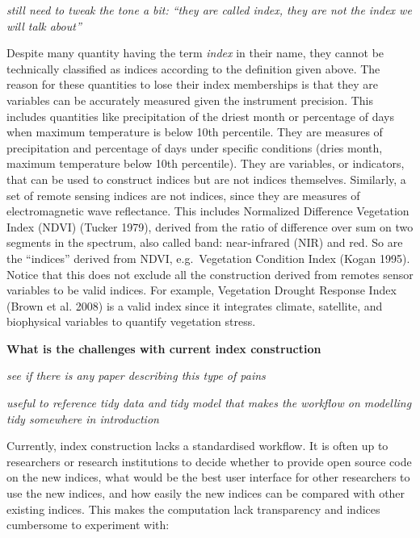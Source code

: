 \documentclass[
]{article}
\begin{document}
\emph{still need to tweak the tone a bit: ``they are called index, they
are not the index we will talk about''}

Despite many quantity having the term \emph{index} in their name, they
cannot be technically classified as indices according to the definition
given above. The reason for these quantities to lose their index
memberships is that they are variables can be accurately measured given
the instrument precision. This includes quantities like precipitation of
the driest month or percentage of days when maximum temperature is below
10th percentile. They are measures of precipitation and percentage of
days under specific conditions (dries month, maximum temperature below
10th percentile). They are variables, or indicators, that can be used to
construct indices but are not indices themselves. Similarly, a set of
remote sensing indices are not indices, since they are measures of
electromagnetic wave reflectance. This includes Normalized Difference
Vegetation Index (NDVI) (Tucker 1979), derived from the ratio of
difference over sum on two segments in the spectrum, also called band:
near-infrared (NIR) and red. So are the ``indices'' derived from NDVI,
e.g.~Vegetation Condition Index (Kogan 1995). Notice that this does not
exclude all the construction derived from remotes sensor variables to be
valid indices. For example, Vegetation Drought Response Index (Brown et
al. 2008) is a valid index since it integrates climate, satellite, and
biophysical variables to quantify vegetation stress.

\textbf{What is the challenges with current index construction}

\emph{see if there is any paper describing this type of pains}

\emph{useful to reference tidy data and tidy model that makes the
workflow on modelling tidy somewhere in introduction}

Currently, index construction lacks a standardised workflow. It is often
up to researchers or research institutions to decide whether to provide
open source code on the new indices, what would be the best user
interface for other researchers to use the new indices, and how easily
the new indices can be compared with other existing indices. This makes
the computation lack transparency and indices cumbersome to experiment
with:
\end{document}
